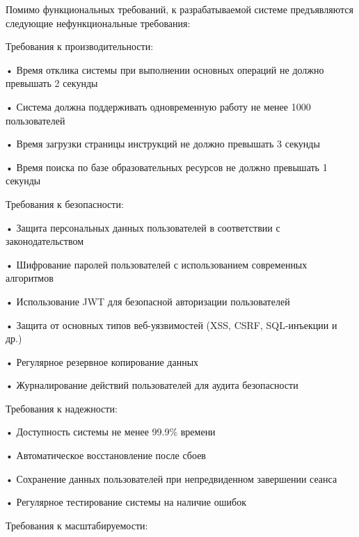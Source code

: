 \subtitlespace

{\gostFont

  \par \redline Помимо функциональных требований, к разрабатываемой системе предъявляются следующие нефункциональные требования:

  \par \redline Требования к производительности:

  \par \redline • Время отклика системы при выполнении основных операций не должно превышать 2 секунды
  \par \redline • Система должна поддерживать одновременную работу не менее 1000 пользователей
  \par \redline • Время загрузки страницы инструкций не должно превышать 3 секунды
  \par \redline • Время поиска по базе образовательных ресурсов не должно превышать 1 секунды

  \par \redline Требования к безопасности:

  \par \redline • Защита персональных данных пользователей в соответствии с законодательством
  \par \redline • Шифрование паролей пользователей с использованием современных алгоритмов
  \par \redline • Использование JWT для безопасной авторизации пользователей
  \par \redline • Защита от основных типов веб-уязвимостей (XSS, CSRF, SQL-инъекции и др.)
  \par \redline • Регулярное резервное копирование данных
  \par \redline • Журналирование действий пользователей для аудита безопасности

  \par \redline Требования к надежности:

  \par \redline • Доступность системы не менее 99.9\% времени
  \par \redline • Автоматическое восстановление после сбоев
  \par \redline • Сохранение данных пользователей при непредвиденном завершении сеанса
  \par \redline • Регулярное тестирование системы на наличие ошибок

  \par \redline Требования к масштабируемости:

}
